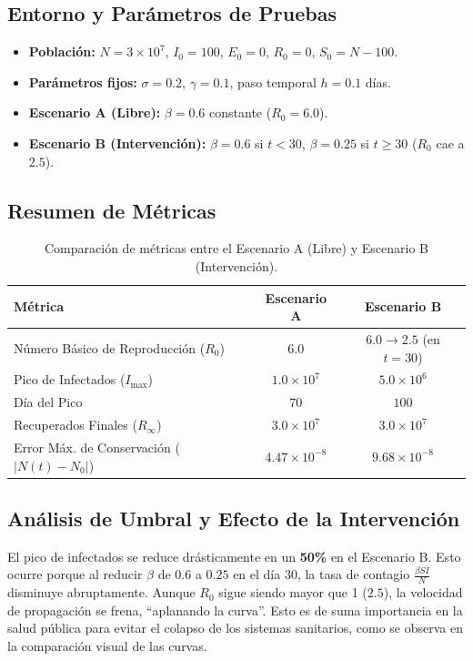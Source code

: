 \documentclass[12pt,a4paper]{article}
\theoremstyle{definition}
\begin{document}
\subsection{Entorno y Par\'{a}metros de Pruebas}
\begin{itemize}
    \item \textbf{Poblaci\'{o}n:} $N = 3 \times 10^7$, $I_0 = 100$, $E_0 = 0$, $R_0 = 0$, $S_0 = N - 100$.
    \item \textbf{Par\'{a}metros fijos:} $\sigma = 0.2$, $\gamma = 0.1$, paso temporal $h = 0.1$ d\'{i}as.
    \item \textbf{Escenario A (Libre):} $\beta = 0.6$ constante ($R_0 = 6.0$).
    \item \textbf{Escenario B (Intervenci\'{o}n):} $\beta = 0.6$ si $t < 30$, $\beta = 0.25$ si $t \geq 30$ ($R_0$ cae a $2.5$).
\end{itemize}

\subsection{Resumen de M\'{e}tricas }

\begin{table}[H]
\centering
\caption{Comparaci\'{o}n de m\'{e}tricas entre el Escenario A (Libre) y Escenario B (Intervenci\'{o}n).}
\label{tab:resumen}
\begin{tabular}{@{}lcc@{}}
\toprule
\textbf{M\'{e}trica} & \textbf{Escenario A} & \textbf{Escenario B} \\ \midrule
N\'{u}mero B\'{a}sico de Reproducci\'{o}n ($R_0$) & $6.0$ & $6.0 \to 2.5$ (en $t=30$) \\
Pico de Infectados ($I_{\text{max}}$) & $1.0 \times 10^7$ & $5.0 \times 10^6$ \\
D\'{i}a del Pico & $70$ & $100$ \\
Recuperados Finales ($R_{\infty}$) & $3.0 \times 10^7$ & $3.0 \times 10^7$ \\
Error M\'{a}x. de Conservaci\'{o}n ($|N(t)-N_0|$) & $4.47 \times 10^{-8}$ & $9.68 \times 10^{-8}$ \\ \bottomrule
\end{tabular}
\end{table}

\subsection{An\'{a}lisis de Umbral y Efecto de la Intervenci\'{o}n}

El pico de infectados se reduce dr\'{a}sticamente en un \textbf{50\%} en el Escenario B. Esto ocurre porque al reducir $\beta$ de $0.6$ a $0.25$ en el d\'{i}a 30, la tasa de contagio $\frac{\beta S I}{N}$ disminuye abruptamente. Aunque $R_0$ sigue siendo mayor que 1 ($2.5$), la velocidad de propagaci\'{o}n se frena, ``aplanando la curva''. Esto es de suma importancia en la salud p\'{u}blica para evitar el colapso de los sistemas sanitarios, como se observa en la comparaci\'{o}n visual de las curvas.
\end{document}
